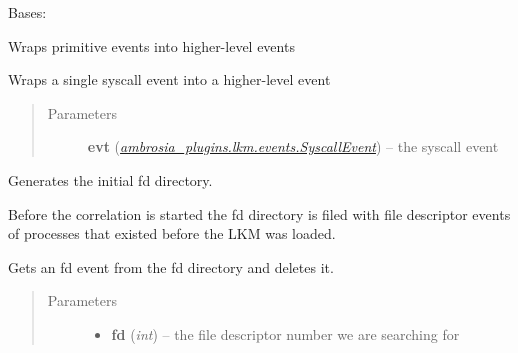\documentclass[letterpaper,10pt,english]{sphinxmanual}
\begin{document}
\begin{fulllineitems}
\label{ambrosia_plugins.lkm:ambrosia_plugins.lkm.SyscallCorrelator}
Bases: {\hyperref[ambrosia:ambrosia.Correlator]{}}

Wraps primitive events into higher-level events

\begin{fulllineitems}
\label{ambrosia_plugins.lkm:ambrosia_plugins.lkm.SyscallCorrelator._check_syscall}
Wraps a single syscall event into a higher-level event
\begin{quote}\begin{description}
\item[{Parameters}] \leavevmode
\textbf{evt} ({\hyperref[ambrosia_plugins.lkm:ambrosia_plugins.lkm.events.SyscallEvent]{\emph{ambrosia\_plugins.lkm.events.SyscallEvent}}}) -- the syscall event

\end{description}\end{quote}

\end{fulllineitems}


\begin{fulllineitems}
\label{ambrosia_plugins.lkm:ambrosia_plugins.lkm.SyscallCorrelator._generate_start_fd_directory}
Generates the initial fd directory.

Before the correlation is started the fd directory is filed with file descriptor events of processes that
existed before the LKM was loaded.

\end{fulllineitems}


\begin{fulllineitems}
\label{ambrosia_plugins.lkm:ambrosia_plugins.lkm.SyscallCorrelator._get_del_fd_event}
Gets an fd event from the fd directory and deletes it.
\begin{quote}\begin{description}
\item[{Parameters}] \leavevmode\begin{itemize}
\item {} 
\textbf{fd} (\emph{int}) -- the file descriptor number we are searching for


\end{itemize}
\end{description}
\end{quote}
\end{fulllineitems}
\end{fulllineitems}
\end{document}
